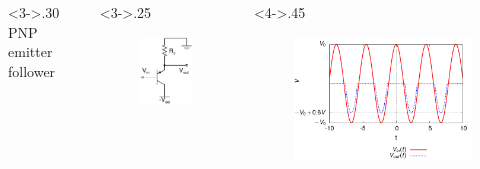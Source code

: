 \documentclass[beamer]{standalone}
\begin{document}
{\begin{columns}[c]
\begin{column}
\begin{figure}
  \end{figure}
 \end{column}
\end{columns}
\begin{columns}[c]
 \begin{column}<3->{.30\textwidth}
  PNP emitter follower
 \end{column}
 \begin{column}<3->{.25\textwidth}
  \begin{figure}
   \includegraphics[height=0.30\textheight]{./schematics/pnp_emitter_follower}
  \end{figure}
 \end{column}
 \begin{column}<4->{.45\textwidth}
  \begin{figure}
   \includegraphics[width=1.00\textwidth,angle=0]{./plots/pnp_follower}
  \end{figure}
 \end{column}
\end{columns}
 }
\end{document}
